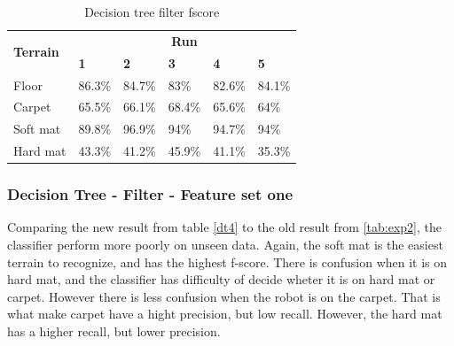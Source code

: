 \documentclass[USenglish]{ifimaster}  %
\begin{document}
\begin{table}[h]
	\centering
	\begin{tabular}{@{}llllll@{}}
		\toprule
		\multirow{2}{*}{\textbf{Terrain}} & \multicolumn{5}{c}{\textbf{Run}} \\ \cmidrule(l){2-6} 
		& \multicolumn{1}{l|}{\textbf{1}} & \multicolumn{1}{l|}{\textbf{2}} & \multicolumn{1}{l|}{\textbf{3}} & \multicolumn{1}{l|}{\textbf{4}} & \textbf{5} \\ \midrule
		\multicolumn{1}{l|}{Floor} & \multicolumn{1}{l|}{86.3\%} & \multicolumn{1}{l|}{84.7\%} & \multicolumn{1}{l|}{83\%} & \multicolumn{1}{l|}{82.6\%} & 84.1\% \\ \midrule
		\multicolumn{1}{l|}{Carpet} & \multicolumn{1}{l|}{65.5\%} & \multicolumn{1}{l|}{66.1\%} & \multicolumn{1}{l|}{68.4\%} & \multicolumn{1}{l|}{65.6\%} & 64\% \\ \midrule
		\multicolumn{1}{l|}{Soft mat} & \multicolumn{1}{l|}{89.8\%} & \multicolumn{1}{l|}{96.9\%} & \multicolumn{1}{l|}{94\%} & \multicolumn{1}{l|}{94.7\%} & 94\% \\ \midrule
		\multicolumn{1}{l|}{Hard mat} & \multicolumn{1}{l|}{43.3\%} & \multicolumn{1}{l|}{41.2\%} & \multicolumn{1}{l|}{45.9\%} & \multicolumn{1}{l|}{41.1\%} & 35.3\% \\ \bottomrule
	\end{tabular}
	\caption{Decision tree filter fscore}
	\label{dtfilterfscore}
\end{table}
\FloatBarrier
\subsubsection{Decision Tree - Filter - Feature set one}
Comparing the new result from table \ref{dt4} to the old result from \ref{tab:exp2}, the classifier perform more poorly on unseen data. Again, the soft mat is the easiest terrain to recognize, and has the highest f-score. There is confusion when it is on hard mat, and the classifier has difficulty of decide wheter it is on hard mat or carpet. However there is less confusion when the robot is on the carpet.  That is what make carpet have a hight precision, but low recall. However, the hard mat has a higher recall, but lower precision.  
\end{document}
